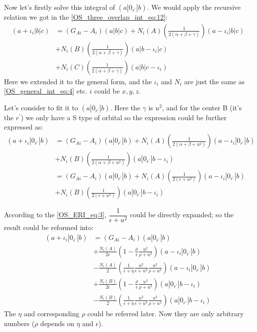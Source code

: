 Now let's firstly solve this integral of $(a|0_{r^{'}}|b)$. We would apply
the recursive relation we got in the \ref{OS_three_overlap_int_eq:12}:
\begin{equation}
 \begin{split}
 (a+\iota_{i}|b|c) 
&= (G_{Ai} - A_{i})(a|b|c) + 
N_{i}(A)\left(\frac{1}{2(\alpha+\beta+\gamma)}\right)(a-\iota_{i}|b|c) \\
&+ 
N_{i}(B)\left(\frac{1}{2(\alpha+\beta+\gamma)}\right)(a|b-\iota_{i}|c) \\
&+
N_{i}(C)\left(\frac{1}{2(\alpha+\beta+\gamma)}\right)(a|b|c-\iota_{i}) 
 \end{split}
\label{OS_ERI_eq:6}
\end{equation}
Here we extended it to the general form, and the $\iota_{i}$ and $N_{i}$ are just
the same as \ref{OS_general_int_eq:4} etc. $i$ could be $x,y, z$.

Let's consider to fit it to $(a|0_{r^{'}}|b)$. Here the $\gamma$ is $u^{2}$, and
for the center B (it's the $r^{'}$) we only have a S type of orbital so the
expression could be further expressed as:
\begin{equation}
 \begin{split}
  (a+\iota_{i}|0_{r^{'}}|b)
&=(G_{Ai} - A_{i})(a|0_{r^{'}}|b) +
N_{i}(A)\left(\frac{1}{2(\alpha+\beta+u^{2})}\right)(a-\iota_{i}|0_{r^{'}}|b) \\
&+
N_{i}(B)\left(\frac{1}{2(\alpha+\beta+u^{2})}\right)(a|0_{r^{'}}|b-\iota_{i}) \\
&=(G_{Ai} - A_{i})(a|0_{r^{'}}|b) +
N_{i}(A)\left(\frac{1}{2(\epsilon+u^{2})}\right)(a-\iota_{i}|0_{r^{'}}|b) \\
&+
N_{i}(B)\left(\frac{1}{2(\epsilon+u^{2})}\right)(a|0_{r^{'}}|b-\iota_{i})
 \end{split}
\label{OS_ERI_eq:7}
\end{equation}

According to the \ref{OS_ERI_eq:3}, $\dfrac{1}{\epsilon+u^{2}}$ could be
directly expanded; so the result could be reformed into:
\begin{equation}
 \begin{split}
  (a+\iota_{i}|0_{r^{'}}|b)
&=(G_{Ai} - A_{i})(a|0_{r^{'}}|b) \\
&+
\frac{N_{i}(A)}{2\epsilon}\left(1-\frac{\rho}{\epsilon}
\frac{u^{2}}{\rho+u^{2}}\right)(a-\iota_{i}|0_{r^{'}}|b) \\
&-\frac{N_{i}(A)}{2}\left(\frac{1}{\epsilon+\eta}
\frac{u^{2}}{\epsilon+u^{2}}\frac{u^{2}}{\rho+u^{2}}\right)(a-\iota_{i}|0_{r^{'}}|b) \\
&+ \frac{N_{i}(B)}{2\epsilon}\left(1-\frac{\rho}{\epsilon}
\frac{u^{2}}{\rho+u^{2}}\right)(a|0_{r^{'}}|b-\iota_{i}) \\
&-\frac{N_{i}(B)}{2}\left(\frac{1}{\epsilon+\eta}
\frac{u^{2}}{\epsilon+u^{2}}\frac{u^{2}}{\rho+u^{2}}\right)(a|0_{r^{'}}|b-\iota_{i})
 \end{split}
\label{OS_ERI_eq:8}
\end{equation}
The $\eta$ and corresponding $\rho$ could be referred later. Now they are only
arbitrary numbers ($\rho$ depends on $\eta$ and $\epsilon$). 

